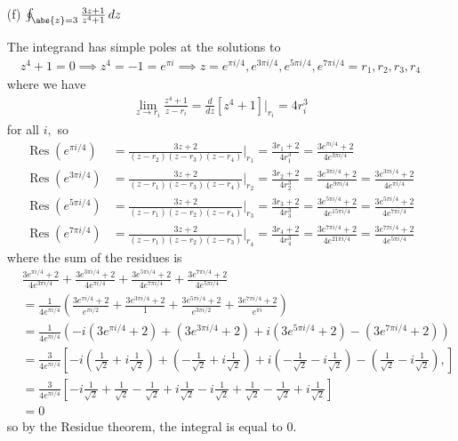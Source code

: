 \documentclass{article}
\DeclareMathOperator{\Res}{Res}
\begin{document}
\begin{itemize}
\begin{itemize}
			\item[(f)] $\oint_{\abs{z}=3} \frac{3z+1}{z^4+1}\, dz$
				\begin{soln}
					The integrand has simple poles at the solutions to 
					\begin{align*}
						z^4+1=0\implies z^4=-1=e^{\pi i} \implies z = e^{\pi i/4}, e^{3\pi i/4 }, e^{5\pi i/4}, e^{7\pi i/4}=r_1, r_2, r_3, r_4
					\end{align*}
					where we have
					\begin{align*}
						\lim_{z\to r_i} \frac{z^4+1}{z-r_i} = \frac{d}{dz}\left[ z^4+1 \right]\bigg\vert_{r_i} = 4r_i^3
					\end{align*}
					for all $i,$ so
					\begin{align*}
						\Res\left(e^{\pi i/4}\right) &= \frac{3z+2}{(z-r_2)(z-r_3)(z-r_4)}\bigg\vert_{r_1} = \frac{3r_1+2}{4r_1^3} = \frac{3e^{\pi i/4}+2}{4e^{3\pi i/4}} \\
						\Res\left(e^{3\pi i/4}\right) &= \frac{3z+2}{(z-r_1)(z-r_3)(z-r_4)}\bigg\vert_{r_2} = \frac{3r_2+2}{4r_2^3} = \frac{3e^{3\pi i/4}+2}{4e^{9\pi i/4}} = \frac{3e^{3\pi i/4}+2}{4e^{\pi i/4}} \\
						\Res\left( e^{5\pi i/4} \right) &= \frac{3z+2}{(z-r_1)(z-r_2)(z-r_4)} \bigg\vert_{r_3} = \frac{3r_3+2}{4r_3^3} = \frac{3e^{5\pi i/4}+2}{4e^{15\pi i/4}} = \frac{3e^{5\pi i/4}+2}{4e^{7\pi i/4}} \\
						\Res\left( e^{7\pi i/4} \right) &= \frac{3z+2}{(z-r_1)(z-r_2)(z-r_3)}\bigg\vert_{r_4} = \frac{3r_4+2}{4r_4^3} = \frac{3e^{7\pi i/4}+2}{4e^{21\pi i/4}} = \frac{3e^{7\pi i/4}+2}{4e^{5\pi i/4}}
					\end{align*}
					where the sum of the residues is
					\begin{align*}
						&\frac{3e^{\pi i/4}+2}{4e^{3\pi i/4}} + \frac{3e^{3\pi i/4}+2}{4e^{\pi i/4}} + \frac{3e^{5\pi i/4}+2}{4e^{7\pi i/4}} + \frac{3e^{7\pi i/4}+2}{4e^{5\pi i/4}} \\
						&= \frac{1}{4e^{\pi i/4}}\left( \frac{3e^{\pi i/4}+2}{e^{\pi i/2}} + \frac{3e^{3\pi i/4}+2}{1} + \frac{3e^{5\pi i/4}+2}{e^{3\pi i/2}} + \frac{3e^{7\pi i/4}+2}{e^{\pi i}} \right) \\
						&= \frac{1}{4e^{\pi i/4}} \left( -i\left( 3e^{\pi i/4}+2 \right) + \left( 3e^{3\pi i/4}+2 \right) + i\left( 3e^{5\pi i/4}+2 \right) - \left( 3e^{7\pi i/4}+2 \right) \right) \\
						&= \frac{3}{4e^{\pi i/4}}\left[ -i\left( \frac{1}{\sqrt{2}} + i\frac{1}{\sqrt{2}} \right) + \left( -\frac{1}{\sqrt{2}} + i\frac{1}{\sqrt{2}} \right) + i\left( -\frac{1}{\sqrt{2}} - i\frac{1}{\sqrt{2}} \right) - \left( \frac{1}{\sqrt{2}} - i\frac{1}{\sqrt{2}} \right),\right] \\
						&= \frac{3}{4e^{\pi i/4}}\left[ -i\frac{1}{\sqrt{2}} + \frac{1}{\sqrt{2}} - \frac{1}{\sqrt{2}} + i\frac{1}{\sqrt{2}} - i\frac{1}{\sqrt{2}} + \frac{1}{\sqrt{2}} - \frac{1}{\sqrt{2}} + i\frac{1}{\sqrt{2}} \right] \\
						&= 0
					\end{align*}
					so by the Residue theorem, the integral is equal to 0.
				\end{soln}
				

\end{itemize}
\end{itemize}
\end{document}
